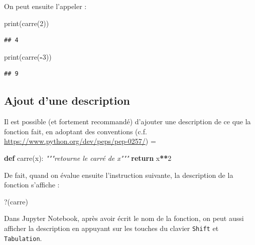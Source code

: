 \documentclass[
  12pt,
]{book}
\newenvironment{Shaded}{\begin{snugshade}}{\end{snugshade}}
\newcommand{\AttributeTok}[1]{\textcolor[rgb]{0.13,0.29,0.53}{#1}}
\newcommand{\BuiltInTok}[1]{#1}
\newcommand{\CommentTok}[1]{\textcolor[rgb]{0.56,0.35,0.01}{\textit{#1}}}
\newcommand{\ControlFlowTok}[1]{\textcolor[rgb]{0.13,0.29,0.53}{\textbf{#1}}}
\newcommand{\DecValTok}[1]{\textcolor[rgb]{0.00,0.00,0.81}{#1}}
\newcommand{\KeywordTok}[1]{\textcolor[rgb]{0.13,0.29,0.53}{\textbf{#1}}}
\newcommand{\NormalTok}[1]{#1}
\newcommand{\OperatorTok}[1]{\textcolor[rgb]{0.81,0.36,0.00}{\textbf{#1}}}
\newcommand{\StringTok}[1]{\textcolor[rgb]{0.31,0.60,0.02}{#1}}
\numberwithin{equation}{section}
\numberwithin{countremarque}{section}
\begin{document}
On peut ensuite l'appeler :

\begin{Shaded}
\begin{Highlighting}[]
\BuiltInTok{print}\NormalTok{(carre(}\DecValTok{2}\NormalTok{))}
\end{Highlighting}
\end{Shaded}

\begin{lstlisting}
## 4
\end{lstlisting}

\begin{Shaded}
\begin{Highlighting}[]
\BuiltInTok{print}\NormalTok{(carre(}\OperatorTok{{-}}\DecValTok{3}\NormalTok{))}
\end{Highlighting}
\end{Shaded}

\begin{lstlisting}
## 9
\end{lstlisting}

\subsection{Ajout d'une description}\label{ajout-dune-description}

Il est possible (et fortement recommandé) d'ajouter une description de ce que la fonction fait, en adoptant des conventions (c.f. \url{https://www.python.org/dev/peps/pep-0257/}) =

\begin{Shaded}
\begin{Highlighting}[]
\KeywordTok{def}\NormalTok{ carre(x):}
  \CommentTok{"""retourne le carré de x"""}
  \ControlFlowTok{return}\NormalTok{ x}\OperatorTok{**}\DecValTok{2}
\end{Highlighting}
\end{Shaded}

De fait, quand on évalue ensuite l'instruction suivante, la description de la fonction s'affiche :

\begin{Shaded}
\begin{Highlighting}[]
\StringTok{\textasciigrave{}}\AttributeTok{?}\StringTok{\textasciigrave{}}\NormalTok{(carre)}
\end{Highlighting}
\end{Shaded}

Dans Jupyter Notebook, après avoir écrit le nom de la fonction, on peut aussi afficher la description en appuyant sur les touches du clavier \texttt{Shift} et \texttt{Tabulation}.
\end{document}
